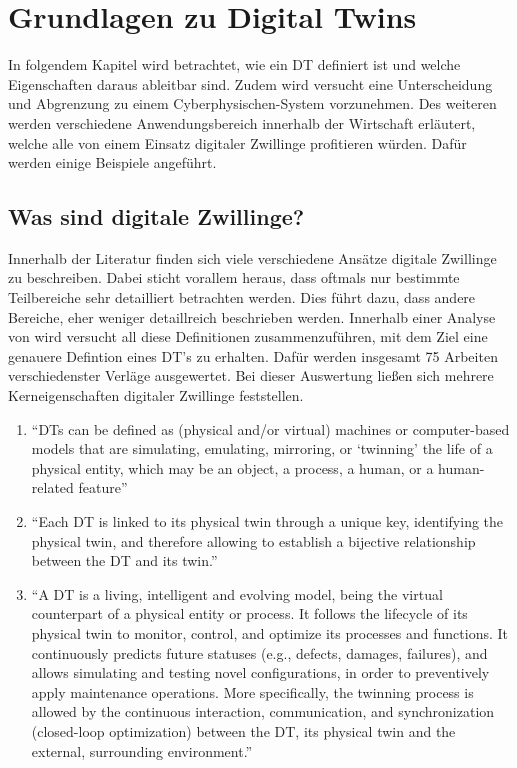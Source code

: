 \chapter{Grundlagen zu Digital Twins}

In folgendem Kapitel wird betrachtet, wie ein \ac{DT} definiert ist und welche Eigenschaften daraus ableitbar sind. Zudem wird versucht eine Unterscheidung und Abgrenzung zu einem Cyberphysischen-System vorzunehmen. Des weiteren werden verschiedene Anwendungsbereich innerhalb der Wirtschaft erläutert, welche alle von einem Einsatz digitaler Zwillinge profitieren würden. Dafür werden einige Beispiele angeführt.

\section{Was sind digitale Zwillinge?}

Innerhalb der Literatur finden sich viele verschiedene Ansätze digitale Zwillinge zu beschreiben. Dabei sticht vorallem heraus, dass oftmals nur bestimmte Teilbereiche sehr detailliert betrachten werden. Dies  führt dazu, dass andere Bereiche, eher weniger detaillreich beschrieben werden. Innerhalb einer Analyse von \citeauthor{barricelli2019survey} wird versucht all diese Definitionen zusammenzuführen, mit dem Ziel eine genauere Defintion eines \ac{DT}'s zu erhalten. Dafür werden insgesamt 75 Arbeiten verschiedenster Verläge ausgewertet.\autocite[S. 4, Kapitel 4]{barricelli2019survey} Bei dieser Auswertung ließen sich mehrere Kerneigenschaften digitaler Zwillinge feststellen.\autocite[\ppno~108953]{fuller2020digital}

\begin{enumerate}
    \item \enquote{\ac{DT}s can be deﬁned as (physical and/or virtual) machines or computer-based models that are simulating, emulating, mirroring, or \enquote{twinning} the life of a physical entity, which may be an object, a process, a human, or a human-related feature}
    \item \enquote{Each DT is linked to its physical twin through a unique key, identifying the physical twin, and therefore allowing to establish a bijective relationship between the DT and its twin.}
    \item \enquote{A DT is a living, intelligent and evolving model, being the virtual counterpart of a physical entity or process. It follows the lifecycle of its physical twin to monitor, control, and optimize its processes and functions. It continuously predicts future statuses (e.g., defects, damages, failures), and allows simulating and testing novel conﬁgurations, in order to preventively apply maintenance operations. More speciﬁcally, the twinning process is allowed by the continuous interaction, communication, and synchronization (closed-loop optimization) between the DT, its physical twin and the external, surrounding environment.}
\end{enumerate}

